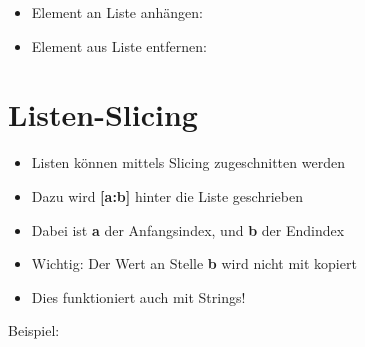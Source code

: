 \begin{frame}
    \slidehead
    \begin{itemize}
        \item Element an Liste anhängen:
            \pause
        \item Element aus Liste entfernen:
    \end{itemize}
\end{frame}

\livecoding

%
\subtitle{Kapitel 5: ganz viele Variablen in einer}


\section{Listen-Slicing}
\begin{frame}
    \slidehead
    \begin{itemize}
        \item Listen können mittels Slicing zugeschnitten werden
            \pause
        \item Dazu wird \textbf{[a:b]} hinter die Liste geschrieben
        \item Dabei ist \textbf{a} der Anfangsindex, und \textbf{b} der Endindex
            \pause
        \item Wichtig: Der Wert an Stelle \textbf{b} wird nicht mit kopiert
        \item Dies funktioniert auch mit Strings!
    \end{itemize}
    \pause

    \begin{block}{Beispiel:}
    \end{block}
\end{frame}

